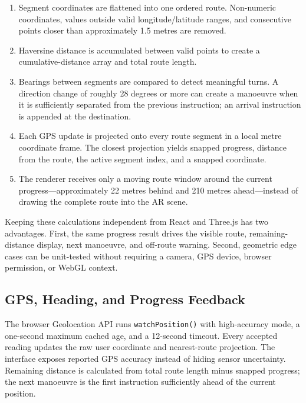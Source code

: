 \documentclass[11pt]{article}
\begin{document}
\begin{enumerate}[leftmargin=*]
    \item Segment coordinates are flattened into one ordered route. Non-numeric coordinates, values outside valid longitude/latitude ranges, and consecutive points closer than approximately 1.5 metres are removed.
    \item Haversine distance is accumulated between valid points to create a cumulative-distance array and total route length.
    \item Bearings between segments are compared to detect meaningful turns. A direction change of roughly 28 degrees or more can create a manoeuvre when it is sufficiently separated from the previous instruction; an arrival instruction is appended at the destination.
    \item Each GPS update is projected onto every route segment in a local metre coordinate frame. The closest projection yields snapped progress, distance from the route, the active segment index, and a snapped coordinate.
    \item The renderer receives only a moving route window around the current progress---approximately 22 metres behind and 210 metres ahead---instead of drawing the complete route into the AR scene.
\end{enumerate}

Keeping these calculations independent from React and Three.js has two advantages. First, the same progress result drives the visible route, remaining-distance display, next manoeuvre, and off-route warning. Second, geometric edge cases can be unit-tested without requiring a camera, GPS device, browser permission, or WebGL context.

\subsection*{GPS, Heading, and Progress Feedback}

The browser Geolocation API runs \texttt{watchPosition()} with high-accuracy mode, a one-second maximum cached age, and a 12-second timeout. Every accepted reading updates the raw user coordinate and nearest-route projection. The interface exposes reported GPS accuracy instead of hiding sensor uncertainty. Remaining distance is calculated from total route length minus snapped progress; the next manoeuvre is the first instruction sufficiently ahead of the current position.
\end{document}
